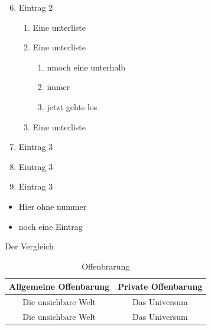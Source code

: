 \documentclass{beamer}
\begin{document}
    \begin{frame}
    \begin{enumerate}
        \setcounter{enumi}{5}
        \item Eintrag 2
            \begin{enumerate}
                \item Eine unterliste
                \item Eine unterliste
                \begin{enumerate}
                    \item nmoch eine unterhalb
                    \item immer
                    \item jetzt gehts los
                \end{enumerate}
                \item Eine unterliste
            \end{enumerate}
        \item Eintrag 3
        \item Eintrag 3
        \item Eintrag 3
    \end{enumerate}
    \end{frame}
    \begin{frame}
    \begin{itemize}
        \item Hier ohne nummer
        \item noch eine Eintrag
    \end{itemize}
\end{frame}
\begin{frame}{Der Vergleich}
    \setlength{\arrayrulewidth}{1pt}
    \setlength{\tabcolsep}{14pt}
    \renewcommand{\arraystretch}{1.2}
    \begin{table}
        \centering
        \begin{tabular}{c|c}
            \textbf{Allgemeine Offenbarung} & \textbf{Private Offenbarung} \\[0.5ex]            
            \hline
            \hline
            Die unsichbare Welt &  Das Universum\\
            \hline
            Die unsichbare Welt &  Das Universum\\
            \hline
        \end{tabular}
        \caption{\tiny Offenbrarung}
        \label{tab:placeholder}
    \end{table}
\end{frame}
\end{document}
